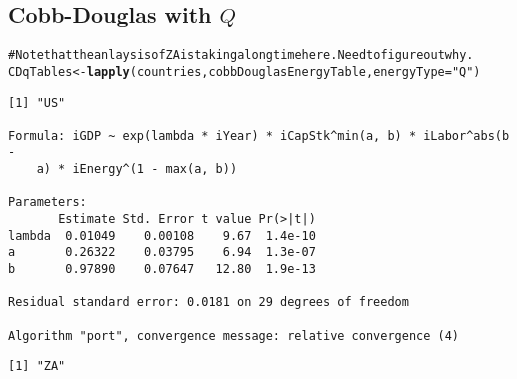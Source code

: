 \documentclass[preprint,authoryear,12pt]{elsarticle}\usepackage{graphicx, color}
\makeatletter
\newcommand{\hlfunctioncall}[1]{\textcolor[rgb]{0.501960784313725,0,0.329411764705882}{\textbf{#1}}}%
\newcommand{\hlstring}[1]{\textcolor[rgb]{0.6,0.6,1}{#1}}%
\newcommand{\hlcomment}[1]{\textcolor[rgb]{0.180392156862745,0.6,0.341176470588235}{#1}}%
\newenvironment{kframe}{%
 \def\at@end@of@kframe{}%
 \ifinner\ifhmode%
  \def\at@end@of@kframe{\end{minipage}}%
  \begin{minipage}{\columnwidth}%
 \fi\fi%
 \def\FrameCommand##1{\hskip\@totalleftmargin \hskip-\fboxsep
 \colorbox{shadecolor}{##1}\hskip-\fboxsep
     \hskip-\linewidth \hskip-\@totalleftmargin \hskip\columnwidth}%
 \MakeFramed {\advance\hsize-\width
   \@totalleftmargin\z@ \linewidth\hsize
   \@setminipage}}%
 {\par\unskip\endMakeFramed%
 \at@end@of@kframe}
\newenvironment{knitrout}{}{} %
\makeatother
\begin{document}
\subsection{Cobb-Douglas with $Q$}

\begin{knitrout}
\color{fgcolor}\begin{kframe}
\begin{alltt}
\hlcomment{# Note that the anlaysis of ZA is taking a long time here. Need to figure out why.}
CDqTables <- \hlfunctioncall{lapply}(countries, cobbDouglasEnergyTable, energyType=\hlstring{"Q"})
\end{alltt}
\begin{verbatim}
[1] "US"

Formula: iGDP ~ exp(lambda * iYear) * iCapStk^min(a, b) * iLabor^abs(b - 
    a) * iEnergy^(1 - max(a, b))

Parameters:
       Estimate Std. Error t value Pr(>|t|)
lambda  0.01049    0.00108    9.67  1.4e-10
a       0.26322    0.03795    6.94  1.3e-07
b       0.97890    0.07647   12.80  1.9e-13

Residual standard error: 0.0181 on 29 degrees of freedom

Algorithm "port", convergence message: relative convergence (4) 
\end{verbatim}


{\ttfamily\noindent\itshape\color{messagecolor}{Waiting for profiling to be done...}}\begin{verbatim}
[1] "ZA"
\end{verbatim}


{\ttfamily\noindent\color{warningcolor}{Warning: longer object length is not a multiple of shorter object length}}

{\ttfamily\noindent\color{warningcolor}{Warning: longer object length is not a multiple of shorter object length}}

{\ttfamily\noindent\color{warningcolor}{Warning: longer object length is not a multiple of shorter object length}}

{\ttfamily\noindent\color{warningcolor}{Warning: longer object length is not a multiple of shorter object length}}

{\ttfamily\noindent\color{warningcolor}{Warning: longer object length is not a multiple of shorter object length}}

{\ttfamily\noindent\color{warningcolor}{Warning: longer object length is not a multiple of shorter object length}}


\end{kframe}
\end{knitrout}
\end{document}
